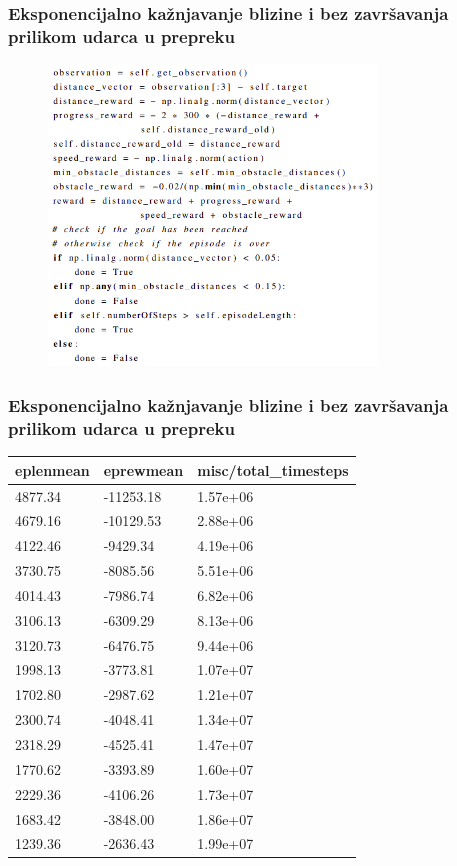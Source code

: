 \documentclass{beamer}
\begin{document}
\begin{frame}
	\frametitle{Eksponencijalno kažnjavanje blizine i bez završavanja prilikom udarca u prepreku}

	\begin{figure}[h!]
		\centering
		\includegraphics[height=8cm]{img/eksp.png}
	\end{figure}

\end{frame}

\begin{frame}
	\frametitle{Eksponencijalno kažnjavanje blizine i bez završavanja prilikom udarca u prepreku}

	\begin{table}[ht!]
		\centering
		\label{tab:rub}
		\begin{tabular}{@{}lll@{}}
			\hline
			eplenmean & eprewmean & misc/total\_timesteps \\
			\hline
			\hline
			4877.34   & -11253.18 & 1.57e+06              \\
			4679.16   & -10129.53 & 2.88e+06              \\
			4122.46   & -9429.34  & 4.19e+06              \\
			3730.75   & -8085.56  & 5.51e+06              \\
			4014.43   & -7986.74  & 6.82e+06              \\
			3106.13   & -6309.29  & 8.13e+06              \\
			3120.73   & -6476.75  & 9.44e+06              \\
			1998.13   & -3773.81  & 1.07e+07              \\
			1702.80   & -2987.62  & 1.21e+07              \\
			2300.74   & -4048.41  & 1.34e+07              \\
			2318.29   & -4525.41  & 1.47e+07              \\
			1770.62   & -3393.89  & 1.60e+07              \\
			2229.36   & -4106.26  & 1.73e+07              \\
			1683.42   & -3848.00  & 1.86e+07              \\
			1239.36   & -2636.43  & 1.99e+07              \\
			\hline
		\end{tabular}
	\end{table}

\end{frame}
\end{document}
